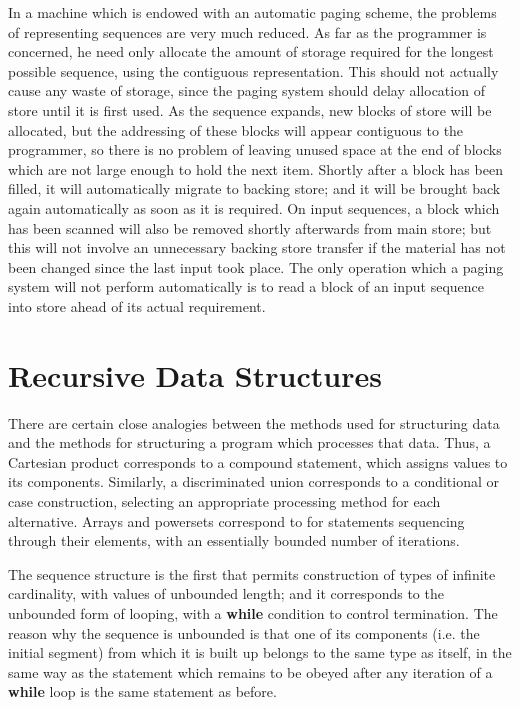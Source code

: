 \documentclass[twoside,11pt]{book}
\begin{document}
In a machine which is endowed with an automatic paging scheme, the problems of representing sequences are very much reduced. As far as the programmer is concerned, he need only allocate the amount of storage required for the longest possible sequence, using the contiguous representation. This should not actually cause any waste of storage, since the paging system should delay allocation of store until it is first used. As the sequence expands, new blocks of store will be allocated, but the addressing of these blocks will appear contiguous to the programmer, so there is no problem of leaving unused space at the end of blocks which are not large enough to hold the next item. Shortly after a block has been filled, it will automatically migrate to backing store; and it will be brought back again automatically as soon as it is required. On input sequences, a block which has been scanned will also be removed shortly afterwards from main store; but this will not involve an unnecessary backing store transfer if the material has not been changed since the last input took place. The only operation which a paging system will not perform automatically is to read a block of an input sequence into store ahead of its actual requirement.

\section[Recursive data structures]{Recursive Data Structures}

There are certain close analogies between the methods used for structuring data and the methods for structuring a program which processes that data. Thus, a Cartesian product corresponds to a compound statement, which assigns values to its components. Similarly, a discriminated union corresponds to a conditional or case construction, selecting an appropriate processing method for each alternative. Arrays and powersets correspond to for statements sequencing through their elements, with an essentially bounded number of iterations.

The sequence structure is the first that permits construction of types of infinite cardinality, with values of unbounded length; and it corresponds to the unbounded form of looping, with a \textbf{while} condition to control termination. The reason why the sequence is unbounded is that one of its components (i.e. the initial segment) from which it is built up belongs to the same type as itself, in the same way as the statement which remains to be obeyed after any iteration of a \textbf{while} loop is the same statement as before.
\end{document}
